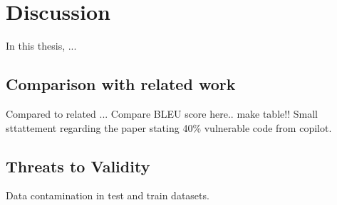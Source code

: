 \chapter{Discussion}
\label{chap:discussion}

In this thesis, ...

\section{Comparison with related work}
Compared to related ...  Compare BLEU score here.. make table!! 
Small sttattement regarding the paper stating 40\% vulnerable code from copilot.



\section{Threats to Validity}

Data contamination in test and train datasets.